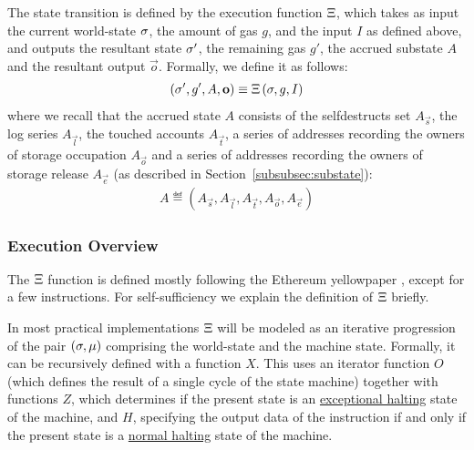 The state transition is defined by the execution function $\mathrm{\Xi}$, which takes as input the current world-state $\mathbf{\sigma}$, the amount of gas $g$, 
and the input $I$ as defined above,
and outputs the resultant state $\mathbf{\sigma}'$, the remaining gas $g'$, the accrued substate $A$ and the resultant output $\vec{o}$.
Formally, we define it as follows:
\begin{align}
	\left( \mathbf{\sigma}', g', A, \mathbf{o} \right) \equiv \mathrm{\Xi}\left(\mathbf{\sigma},g, I\right)
\end{align}
where we recall that the accrued state $A$ consists of the selfdestructs set $A_\vec{s}$, the log series $A_\vec{l}$, the touched accounts $A_\vec{t}$, a series of addresses recording the owners of storage occupation $A_\vec{o}$ and a series of addresses recording the owners of storage release $A_\vec{e}$
(as described in Section~\ref{subsubsec:substate}):
\begin{align}
	A\eqdef\left(A_\vec{s},A_\vec{l},A_\vec{t},A_\vec{o},A_\vec{e} \right)
\end{align}


\subsubsection{Execution Overview}

The $\mathrm{\Xi}$ function is defined mostly following the Ethereum yellowpaper \cite{ETH_yellow}, except for a few instructions. 
For self-sufficiency we explain the definition of $\mathrm{\Xi}$ briefly.

In most practical implementations $\mathrm{\Xi}$ will be modeled as an iterative progression of the pair $(\mathbf{\sigma},\mathbf{\mu})$ comprising the world-state and the machine state. 
Formally, it can be recursively defined with a function $X$. This uses an iterator function $O$ (which defines the result of a single cycle of the state machine) together with functions \hyperlink{zhalt}{$Z$}, which determines if the present state is an \hyperlink{zhalt}{exceptional halting} state of the machine, and \hyperlink{hhalt}{$H$}, specifying the output data of the instruction if and only if the present state is a \hyperlink{hhalt}{normal halting} state of the machine.

